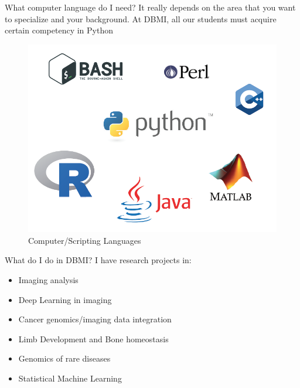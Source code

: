 \documentclass{beamer}
\begin{document}
	
	\begin{frame}{What computer language do I need?}
		It really depends on the area that you want to specialize and your
		background. At DBMI, all our students must acquire certain competency in
		Python
		\begin{figure}[h]
			\centering
			\includegraphics[scale=0.45]{Figures/languages.png}
			\caption{Computer/Scripting Languages}
		\end{figure}
		
	\end{frame}
	
	\begin{frame}{What do I do in DBMI?}
		I have research projects in:
		\begin{itemize}
			\item Imaging analysis
			\item Deep Learning in imaging
			\item Cancer genomics/imaging data integration
			\item Limb Development and Bone homeostasis
			\item Genomics of rare diseases
			\item Statistical Machine Learning
		\end{itemize}
		
	\end{frame}
	
\end{document}
